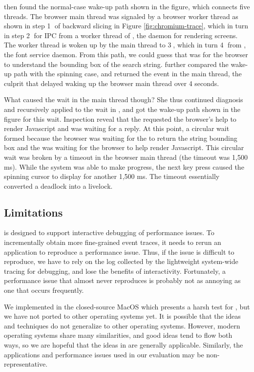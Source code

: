 \xxx then found the normal-case wake-up path shown in the figure, which
connects five threads.  The browser main thread was signaled by a browser
worker thread as shown in step \textcircled{1} of backward slicing in Figure
\ref{fig:chromium-trace}, which in turn  in step \textcircled{2}
for IPC from a worker thread of , the daemon for rendering screens.
The  worker thread is woken up by the  main thread to
 \textcircled{3}, which in turn  \textcircled{4}
from , the font service daemon.  From this path, we could guess that
 was for the browser to understand the bounding box of
the search string.  \xxx further compared the wake-up path with the spinning
case, and returned the  event in the  main
thread, the culprit that delayed waking up the browser main thread over 4
seconds.

What caused the wait in the  main thread though?  She thus
continued diagnosis and recursively applied \xxx to the wait in ,
and got the wake-up path shown in the figure for this wait.  Inspection reveal
that the  requested the browser's help to render Javascript and was
waiting for a reply.  At this point, a circular wait formed because the browser
was waiting for the  to return the string bounding box and the
 was waiting for the browser to help render Javascript.  This
circular wait was broken by a timeout in the browser main thread (the
 timeout was 1,500 ms).  While the system was able to make
progress, the next key press caused the spinning cursor to display for another
1,500 ms.  The timeout essentially converted a deadlock into a livelock.

\subsection{Limitations}

\xxx is designed to support interactive debugging of performance issues.  To
incrementally obtain more fine-grained event traces, it needs to rerun an
application to reproduce a performance issue.  Thus, if the issue is difficult
to reproduce, we have to rely on the log collected by the lightweight
system-wide tracing for debugging, and lose the benefits of interactivity.
Fortunately, a performance issue that almost never reproduces is probably not
as annoying as one that occurs frequently.

We implemented \xxx in the closed-source MacOS which presents a harsh test for
\xxx, but we have not ported \xxx to other operating systems yet.  It is
possible that the ideas and techniques do not generalize to other operating
systems.  However, modern operating systems share many similarities, and good
ideas tend to flow both ways, so we are hopeful that the ideas in \xxx are
generally applicable.  Similarly, the applications and performance issues used
in our evaluation may be non-representative.
